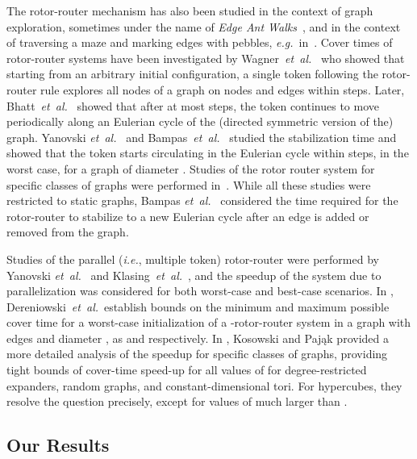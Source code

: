 \documentclass{article}[11pt,letter]
\newcommand{\ie}{{\it i.e.}\xspace}
\newcommand{\eg}{{\it e.g.}\xspace}
\newcommand{\etal}{{\it et~al.}}
\begin{document}
The rotor-router mechanism has also been studied in the context of graph exploration, sometimes under the name of {\em Edge Ant Walks\/}~\cite{Wagner99distributedcovering,YanovskiWB03}, and in the context of traversing a maze and marking edges with pebbles, \eg~in~\cite{BhattEGT02}. Cover times of rotor-router systems have been investigated by Wagner~\etal~\cite{Wagner99distributedcovering} who showed that starting from an arbitrary initial configuration\footnotemark[1], a single token following the rotor-router rule explores all nodes of a graph on  nodes and  edges within  steps. Later, Bhatt~\etal~\cite{BhattEGT02} showed that after at most  steps, the token continues to move periodically along an Eulerian cycle of the (directed symmetric version of the) graph. Yanovski \etal~\cite{YanovskiWB03} and Bampas~\etal~\cite{BHKKR09} studied the stabilization time and showed that the token starts circulating in the Eulerian cycle within  steps, in the worst case, for a graph of diameter . Studies of the rotor router system for specific classes of graphs were performed in~\cite{FS10}. While all these studies were restricted to static graphs, Bampas \etal~\cite{BGKKR09}  considered the time required for the rotor-router to stabilize to a new Eulerian cycle after an edge is added or removed from the graph.

Studies of the parallel (\ie, multiple token) rotor-router were performed by Yanovski \etal~\cite{YanovskiWB03} and Klasing~\etal~\cite{DBLP:conf/podc/KlasingKPS13}, and the speedup of the system due to parallelization was considered for both worst-case and best-case scenarios.  In \cite{DereniowskiKPU14}, Dereniowski~\etal\ establish bounds on the minimum and maximum possible cover time for a worst-case initialization of a -rotor-router system in a graph  with  edges and diameter ,  as   and  respectively.  In \cite{KosowskiP14}, Kosowski and Pająk provided a more detailed analysis of the speedup for specific classes of graphs, providing tight bounds of cover-time speed-up for all values of  for degree-restricted expanders, random graphs, and constant-dimensional tori. For hypercubes, they resolve the question precisely, except for values of  much larger than .



\subsection{Our Results}
\end{document}
